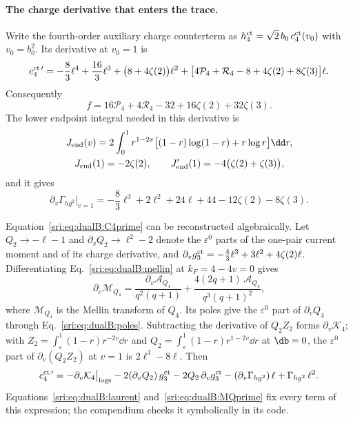 \paragraph{The charge derivative that enters the trace.} Write the fourth-order auxiliary charge counterterm as
$h^{\rm ct}_4=\sqrt2\,b_0\,c^{\rm ct}_4(v_0)$ with $v_0=b_0^2$. Its derivative at $v_0=1$ is
\begin{equation}
 c^{\rm ct\,\prime}_4=-\frac83\ell^4+\frac{16}{3}\ell^3+\bigl(8+4\zeta(2)\bigr)\ell^2
 +\bigl[4\mathcal P_4+\mathcal R_4-8+4\zeta(2)+8\zeta(3)\bigr]\ell.
 \label{sri:eq:dualB:C4prime}
\end{equation}
Consequently
\begin{equation}
 f=16\mathcal P_4+4\mathcal R_4-32+16\zeta(2)+32\zeta(3).
 \label{sri:eq:dualB:fperiod}
\end{equation}
The lower endpoint integral needed in this derivative is
\begin{equation}
\begin{gathered}
 J_{\rm end}(v)=2\int_0^1r^{1-2v}\bigl[(1-r)\log(1-r)+r\log r\bigr]\dd r,\\
 J_{\rm end}(1)=-2\zeta(2),\qquad J_{\rm end}'(1)=-4\bigl(\zeta(2)+\zeta(3)\bigr),
\end{gathered}
\end{equation}
and it gives
\begin{equation}
 \partial_v\Gamma_{hg^2}\big|_{v=1}=-\frac83\ell^3+2\ell^2+24\ell+44-12\zeta(2)-8\zeta(3).
 \label{sri:eq:dualB:Hmixedprime}
\end{equation}

Equation~\eqref{sri:eq:dualB:C4prime} can be reconstructed algebraically. Let $Q_2\to-\ell-1$ and
$\partial_vQ_2\to\ell^2-2$ denote the $\varepsilon^0$ parts of the one-pair current moment and of its charge
derivative, and $\partial_vg^{\rm ct}_3=-\frac43\ell^3+3\ell^2+4\zeta(2)\ell$. Differentiating
Eq.~\eqref{sri:eq:dualB:mellin} at $k_F=4-4v=0$ gives
\begin{equation}
 \partial_v\mathcal M_{Q_4}=\frac{\partial_v\mathcal A_{Q_4}}{q^2(q+1)}+\frac{4(2q+1)\,\mathcal A_{Q_4}}{q^3(q+1)^2},
 \label{sri:eq:dualB:MQprime}
\end{equation}
where $\mathcal M_{Q_4}$ is the Mellin transform of $Q_4$. Its poles give the $\varepsilon^0$ part of $\partial_vQ_4$
through Eq.~\eqref{sri:eq:dualB:poles}. Subtracting the derivative of $Q_2Z_2$ forms $\partial_v\mathcal K_4$; with
$Z_2=\int_\varepsilon^1(1-r)r^{-2v}\dd r$ and $Q_2=\int_\varepsilon^1(1-r)r^{1-2v}\dd r$ at $\db=0$, the
$\varepsilon^0$ part of $\partial_v(Q_2Z_2)$ at $v=1$ is $2\ell^3-8\ell$. Then
\begin{equation}
 c^{\rm ct\,\prime}_4=-\partial_v\mathcal K_4\big|_{\rm logs}-2(\partial_vQ_2)\,g^{\rm ct}_3-2Q_2\,\partial_vg^{\rm ct}_3
 -(\partial_v\Gamma_{hg^2})\,\ell+\Gamma_{hg^2}\,\ell^2.
 \label{sri:eq:dualB:C4prassembly}
\end{equation}
Equations~\eqref{sri:eq:dualB:laurent} and~\eqref{sri:eq:dualB:MQprime} fix every term of this expression; the compendium
checks it symbolically in its code.

